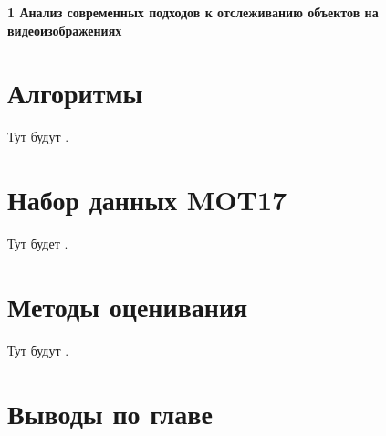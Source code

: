 \newpage
\begin{flushleft}
  \textbf{\large 1 Анализ современных подходов к отслеживанию объектов на видеоизображениях}
\end{flushleft}

\section{Алгоритмы}
Тут будут \cite{aharon2022bot, cao2023observation, du2023strongsort, maggiolino2023deep, stadler2023improved, zhang2022bytetrack}.

\section{Набор данных MOT17}
Тут будет \cite{dendorfer2021motchallenge}.

\section{Методы оценивания}
Тут будут \cite{luiten2021hota, bernardin2008evaluating, ristani2016performance}.

\section{Выводы по главе}

